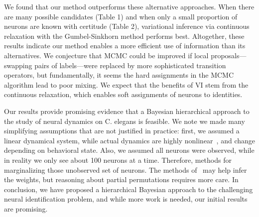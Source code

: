 \documentclass{article}
\begin{document}
We found that our method outperforms these alternative
approaches. When there are many possible candidates (Table 1) and when
only a small proportion of neurons are known with certitude (Table 2),
variational inference via continuous relaxation with the
Gumbel-Sinkhorn method performs best.  Altogether, these results
indicate our method enables a more efficient use of information than
its alternatives. We conjecture that MCMC could be improved if local
proposals---swapping pairs of labels---were replaced by more
sophisticated transition operators, but fundamentally, it seems the
hard assignments in the MCMC algorithm lead to poor mixing.  We expect
that the benefits of VI stem from the continuous relaxation, which
enables soft assignments of neurons to identities.

Our results provide promising evidence that a Bayesian hierarchical
approach to the study of neural dynamics on C. elegans is feasible. We
note we made many simplifying assumptions that are not justified in
practice: first, we assumed a linear dynamical system, while actual
dynamics are highly nonlinear~\citep{Kato2015}, and change depending
on behavioral state. Also, we assumed all neurons were observed, while
in reality we only see about 100 neurons at a time. Therefore, methods
for marginalizing those unobserved set of neurons. The methods
of~\citet{Soudry2015} may help infer the weights, but reasoning about
partial permutations requires more care. In conclusion, we have proposed
a hierarchical Bayesian approach to the challenging neural identification
problem, and while more work is needed, our initial results are promising.

\clearpage



\end{document}
